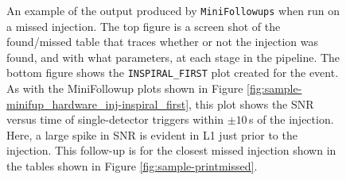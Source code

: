 \begin{figure}[p]
\center
{}
\label{fig:sample-minifup_missedinj}
\caption{An example of the output produced by \texttt{MiniFollowups} when run
on a missed injection. The top figure is a screen shot of the found/missed
table that traces whether or not the injection was found, and with what
parameters, at each stage in the pipeline. The bottom figure shows the
\texttt{INSPIRAL\_FIRST} plot created for the event. As with the MiniFollowup
plots shown in Figure \ref{fig:sample-minifup_hardware_inj-inspiral_first},
this plot shows the SNR versus time of single-detector triggers within $\pm
10\,$s of the injection. Here, a large spike in SNR is evident in L1 just prior
to the injection. This follow-up is for the closest missed injection shown in
the tables shown in Figure \ref{fig:sample-printmissed}.}
\end{figure}

